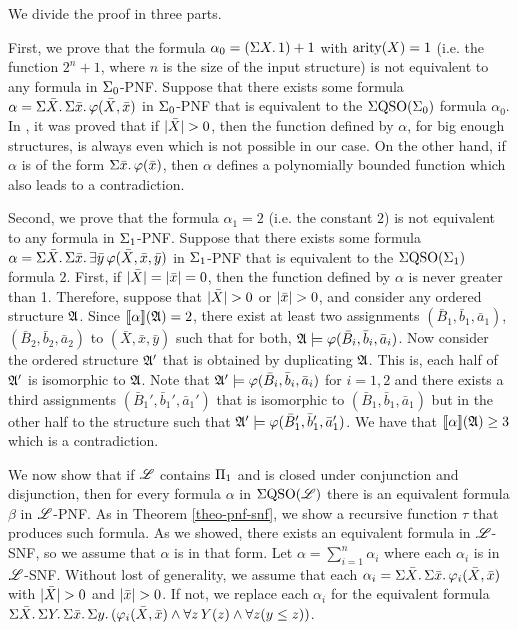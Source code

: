 We divide the proof in three parts.

\vspace{1em}
First, we prove that the formula $\alpha_{0} = \left( \Sigma{X}.\, 1 \right) + 1$ with ${\rm arity}(X) = 1$ (i.e. the function $2^{n}+1$, where $n$ is the size of the input structure) is not equivalent to any formula in $\Sigma_{0}$-PNF. Suppose that there exists some formula $\alpha = \Sigma{\bar{X}}.\,\Sigma{\bar{x}}.\,\varphi(\bar{X},\bar{x})$ in $\Sigma_{0}$-PNF that is equivalent to the $\Sigma{\rm QSO}(\Sigma_{0})$ formula $\alpha_0$.
In \cite{SalujaST95}, it was proved that if $\vert \bar{X} \vert > 0$, then the function defined by $\alpha$, for big enough structures, is always even which is not possible in our case.
On the other hand, if $\alpha$ is of the form $\Sigma{\bar{x}}.\,\varphi(\bar{x})$, then $\alpha$ defines a polynomially bounded function which also leads to a contradiction.

\vspace{1em}
Second, we prove that the formula $\alpha_{1} = 2$ (i.e. the constant $2$) is not equivalent to any formula in $\Sigma_{1}$-PNF. Suppose that there exists some formula $\alpha = \Sigma{\bar{X}}.\,\Sigma{\bar{x}}.\,\exists\bar{y}\, \varphi(\bar{X},\bar{x},\bar{y})$ in $\Sigma_{1}$-PNF that is equivalent to the $\Sigma{\rm QSO}(\Sigma_{1})$ formula $2$. 
First, if $\vert \bar{X} \vert = \vert \bar{x} \vert = 0$, then the function defined by $\alpha$ is never greater than 1. 
Therefore, suppose that $\vert \bar{X} \vert > 0$ or $\vert \bar{x} \vert > 0$, and consider any ordered structure $\mathfrak{A}$. 
Since ${\llbracket{}{\alpha}\rrbracket}(\mathfrak{A}) = 2$, there exist at least two assignments $(\bar{B}_1,\bar{b}_1,\bar{a}_1)$, $(\bar{B}_2,\bar{b}_2,\bar{a}_2)$ to $(\bar{X},\bar{x},\bar{y})$ such that for both, $\mathfrak{A}\models\varphi(\bar{B}_i,\bar{b}_i,\bar{a}_i)$. Now consider the ordered structure $\mathfrak{A}'$ that is obtained by duplicating $\mathfrak{A}$. This is, each half of $\mathfrak{A}'$ is isomorphic to $\mathfrak{A}$. Note that $\mathfrak{A}'\models\varphi(\bar{B}_i,\bar{b}_i,\bar{a}_i)$ for $i = 1,2$ and there exists a third assignments $(\bar{B}_1',\bar{b}_1',\bar{a}_1')$ that is isomorphic to $(\bar{B}_1,\bar{b}_1,\bar{a}_1)$ but in the other half to the structure such that $\mathfrak{A}'\models\varphi(\bar{B}_1',\bar{b}_1',\bar{a}_1')$. We have that ${\llbracket{}{\alpha}\rrbracket}(\mathfrak{A}) \geq 3$ which is a contradiction.

\vspace{1em}
We now show that if $\mathscr{L}$ contains $\Pi_{1}$ and is closed under conjunction and disjunction, then for every formula $\alpha$ in $\Sigma{\rm QSO}(\mathscr{L})$ there is an equivalent formula $\beta$ in $\mathscr{L}$-PNF. As in Theorem \ref{theo-pnf-snf}, we show a recursive function $\tau$ that produces such formula. As we showed, there exists an equivalent formula in $\mathscr{L}$-SNF, so we assume that $\alpha$ is in that form. Let $\alpha = \sum_{i = 1}^n \alpha_i$ where each $\alpha_i$ is in $\mathscr{L}$-SNF. 
Without lost of generality, we assume that each $\alpha_i = \Sigma{\bar{X}}.\,\Sigma{\bar{x}}.\,\varphi_i(\bar{X},\bar{x})$ with $\vert \bar{X} \vert > 0$ and $\vert \bar{x} \vert > 0$. If not, we replace each $\alpha_i$ for the equivalent formula $\Sigma{\bar{X}}.\, \Sigma{Y}.\,\Sigma{\bar{x}}.\,\Sigma{y}.\,(\varphi_i(\bar{X},\bar{x})\wedge\forall z\,Y(z) \wedge \forall z(y \leq z))$.

